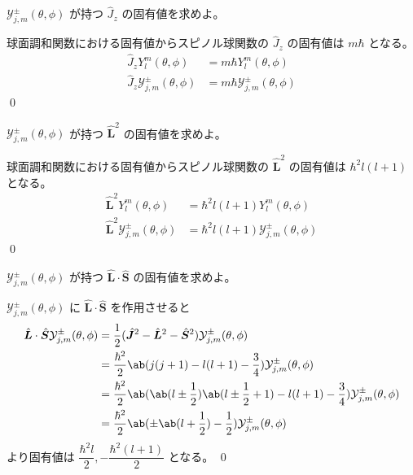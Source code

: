 \documentclass[uplatex,dvipdfmx,a4paper,11pt]{jlreq}
\makeatletter
\numberwithin{equation}{section}
\theoremstyle{definition}
\renewenvironment{proof}[1][\proofname]{\par
  \normalfont
  \topsep6\p@\@plus6\p@ \trivlist
  \item[\hskip\labelsep{\bfseries #1}\@addpunct{\bfseries}]\ignorespaces\quad\par
}{%
  \qed\endtrivlist\@endpefalse
}
\renewcommand\proofname{証明}
\makeatother
\begin{document}
\begin{problem}
$\mathcal{Y}_{j, m}^\pm(\theta, \phi)$ が持つ $\hat{J}_z$ の固有値を求めよ。
\end{problem}
\begin{proof}
  球面調和関数における固有値からスピノル球関数の $\hat{J}_z$ の固有値は $m\hbar$ となる。
  \begin{align}
    \hat{J}_zY_l^m(\theta, \phi)                  & = m\hbar Y_l^m(\theta, \phi)                  \\
    \hat{J}_z\mathcal{Y}_{j, m}^\pm(\theta, \phi) & = m\hbar \mathcal{Y}_{j, m}^\pm(\theta, \phi)
  \end{align}
\end{proof}

\begin{problem}
$\mathcal{Y}_{j, m}^\pm(\theta, \phi)$ が持つ $\hat{\bm{L}}^2$ の固有値を求めよ。
\end{problem}
\begin{proof}
  球面調和関数における固有値からスピノル球関数の $\hat{\bm{L}}^2$ の固有値は $\hbar^2l(l+1)$ となる。
  \begin{align}
    \hat{\bm{L}}^2Y_l^m(\theta, \phi)                  & = \hbar^2l(l+1) Y_l^m(\theta, \phi)                  \\
    \hat{\bm{L}}^2\mathcal{Y}_{j, m}^\pm(\theta, \phi) & = \hbar^2l(l+1) \mathcal{Y}_{j, m}^\pm(\theta, \phi)
  \end{align}
\end{proof}

\begin{problem}
$\mathcal{Y}_{j, m}^\pm(\theta, \phi)$ が持つ $\hat{\bm{L}}\cdot\hat{\bm{S}}$ の固有値を求めよ。
\end{problem}
\begin{proof}
  $\mathcal{Y}_{j, m}^\pm(\theta, \phi)$ に $\hat{\bm{L}}\cdot\hat{\bm{S}}$ を作用させると
  \begin{align}
    \hat{\bm{L}}\cdot\hat{\bm{S}}\mathcal{Y}_{j, m}^\pm(\theta, \phi) & = \frac{1}{2}(\hat{\bm{J}}^2 - \hat{\bm{L}}^2 - \hat{\bm{S}}^2)\mathcal{Y}_{j, m}^\pm(\theta, \phi)                             \\
                                                                      & = \frac{\hbar^2}{2}\ab(j(j+1) - l(l+1) - \frac{3}{4})\mathcal{Y}_{j, m}^\pm(\theta, \phi)                                       \\
                                                                      & = \frac{\hbar^2}{2}\ab(\ab(l\pm \frac{1}{2})\ab(l\pm \frac{1}{2}+1) - l(l+1) - \frac{3}{4})\mathcal{Y}_{j, m}^\pm(\theta, \phi) \\
                                                                      & = \frac{\hbar^2}{2}\ab(\pm\ab(l + \frac{1}{2}) - \frac{1}{2})\mathcal{Y}_{j, m}^\pm(\theta, \phi)                               \\
  \end{align}
  より固有値は $\dfrac{\hbar^2l}{2}, -\dfrac{\hbar^2(l+1)}{2}$ となる。
\end{proof}
\end{document}
